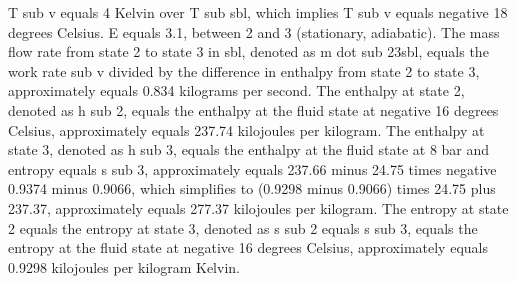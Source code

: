T sub v equals 4 Kelvin over T sub sbl, which implies T sub v equals negative 18 degrees Celsius.
E equals 3.1, between 2 and 3 (stationary, adiabatic).
The mass flow rate from state 2 to state 3 in sbl, denoted as m dot sub 23sbl, equals the work rate sub v divided by the difference in enthalpy from state 2 to state 3, approximately equals 0.834 kilograms per second.
The enthalpy at state 2, denoted as h sub 2, equals the enthalpy at the fluid state at negative 16 degrees Celsius, approximately equals 237.74 kilojoules per kilogram.
The enthalpy at state 3, denoted as h sub 3, equals the enthalpy at the fluid state at 8 bar and entropy equals s sub 3, approximately equals 237.66 minus 24.75 times negative 0.9374 minus 0.9066, which simplifies to (0.9298 minus 0.9066) times 24.75 plus 237.37, approximately equals 277.37 kilojoules per kilogram.
The entropy at state 2 equals the entropy at state 3, denoted as s sub 2 equals s sub 3, equals the entropy at the fluid state at negative 16 degrees Celsius, approximately equals 0.9298 kilojoules per kilogram Kelvin.